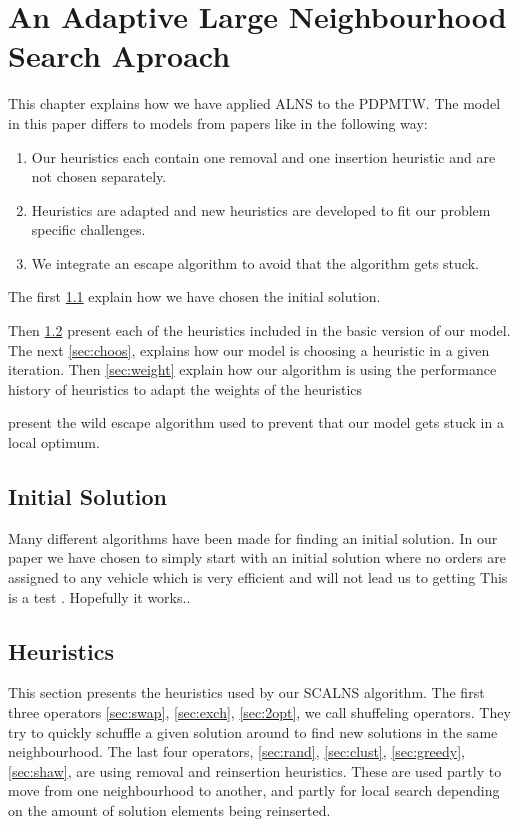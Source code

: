 \documentclass[../main.tex]{subfiles}
\begin{document}
                                                
\chapter{An Adaptive Large Neighbourhood Search Aproach}
\label{ch:appr}
This chapter explains how we have applied ALNS to the PDPMTW. The model in this paper differs to models from papers like \cite{ropke06} in the following way:
\begin{enumerate}
    \item Our heuristics each contain one removal and one insertion heuristic and are not chosen separately. 
    \item Heuristics are adapted and new heuristics are developed to fit our problem specific challenges.
    \item We integrate an escape algorithm to avoid that the algorithm gets stuck.
\end{enumerate}

The first \cref{sec:init} explain how we have chosen the initial solution.\par
Then \cref{sec:heur} present each of the heuristics included in the basic version of our model.
The next \cref{sec:choos}, explains how our model is choosing a heuristic in a given iteration. 
Then \cref{sec:weight} explain how our algorithm is using the performance history of heuristics to adapt the weights of the heuristics 

 present the wild escape algorithm used to prevent that our model gets stuck in a local optimum.

\section{Initial Solution}
\label{sec:init}
Many different algorithms have been made for finding an initial solution. In our paper we have chosen to simply start with an initial solution where no orders are assigned to any vehicle which is very efficient and will not lead us to getting 
This is a test \cite{shaw97}. Hopefully it works..              

\section{Heuristics}
\label{sec:heur}
This section presents the heuristics used by our SCALNS algorithm.
The first three operators \ref{sec:swap}, \ref{sec:exch}, \ref{sec:2opt}, we call shuffeling operators. They try to quickly schuffle a given solution around to find new solutions in the same neighbourhood.
The last four operators, \ref{sec:rand}, \ref{sec:clust}, \ref{sec:greedy}, \ref{sec:shaw}, are using removal and reinsertion heuristics. These are used partly to move from one neighbourhood to another, and partly for local search depending on the  amount of solution elements being reinserted.  
\end{document}
